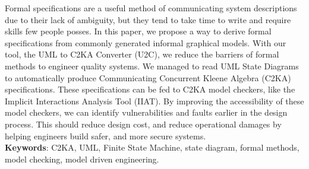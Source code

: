 





\abstract
Formal specifications are a useful method of communicating system descriptions due to their lack of ambiguity,
but they tend to take time to write and require skills few people posses.
In this paper, we propose a way to derive formal specifications from commonly generated informal graphical models.
With our tool, the UML to C2KA Converter (U2C),
we reduce the barriers of formal methods to engineer quality systems.
We managed to read UML State Diagrams to automatically produce Communicating Concurrent Kleene Algebra (C2KA) specifications.
These specifications can be fed to C2KA model checkers, like the Implicit Interactions Analysis Tool (IIAT).
By improving the accessibility of these model checkers, we can identify vulnerabilities and faults earlier in the design process.
This should reduce design cost, and reduce operational damages by helping engineers build safer, and more secure systems.
\\
\textbf{Keywords}: C2KA, UML, Finite State Machine, state diagram, formal methods, model checking, model driven engineering.
